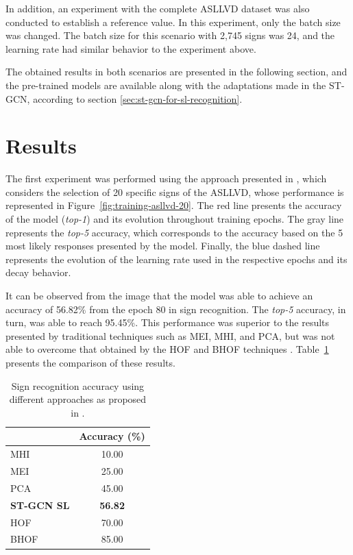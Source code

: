 In addition, an experiment with the complete ASLLVD dataset was also conducted to establish a reference value. In this experiment, only the batch size was changed. The batch size for this scenario with 2,745 signs was 24, and the learning rate had similar behavior to the experiment above.

The obtained results in both scenarios are presented in the following section, and the pre-trained models are available along with the adaptations made in the ST-GCN, according to section \ref{sec:st-gcn-for-sl-recognition}.


\section{Results} 
\label{sec:results}

The first experiment was performed using the approach presented in \cite{lim-2016}, which considers the selection of 20 specific signs of the ASLLVD, whose performance is represented in Figure~\ref{fig:training-asllvd-20}. The red line presents the accuracy of the model (\textit{top-1}) and its evolution throughout training epochs. The gray line represents the \textit{top-5} accuracy, which corresponds to the accuracy based on the 5 most likely responses presented by the model. Finally, the blue dashed line represents the evolution of the learning rate used in the respective epochs and its decay behavior.

It can be observed from the image that the model was able to achieve an accuracy of 56.82\% from the epoch 80 in sign recognition. The \textit{top-5} accuracy, in turn, was able to reach 95.45\%. This performance was superior to the results presented by traditional techniques such as MEI, MHI, and PCA, but was not able to overcome that obtained by the HOF and BHOF techniques \cite{lim-2016}. Table~\ref{tab:results-comparison-20} presents the comparison of these results.

\begin{table}[ht]
\centering
\caption{Sign recognition accuracy using different approaches \newline 
    as proposed in \cite{lim-2016}.}
\label{tab:results-comparison-20}
\begin{tabular}{lc}
\hline
                   & Accuracy (\%)  \\ \hline
MHI                & 10.00                     \\
MEI                & 25.00                     \\
PCA                & 45.00                     \\
\textbf{ST-GCN SL} & \textbf{56.82}            \\
HOF                & 70.00                     \\
BHOF               & 85.00                     \\ \hline
\end{tabular}
\end{table}

